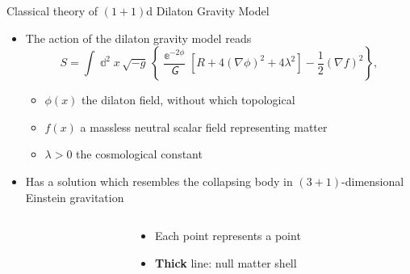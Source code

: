 \documentclass{beamer}
\newcommand{\ee}{{\Bbbe}}
\newcommand{\rbr}[1]{{\left(#1\right)}}
\newcommand{\sbr}[1]{{\left[#1\right]}}
\newcommand{\cbr}[1]{{\left\{#1\right\}}}
\newcommand{\rfun}[2]{{#1}\mathopen{}\left(#2\right)\mathclose{}}
\newcommand{\dd}{\Bbbd}
\newcommand{\ol}[1]{{\overline{{#1}}}}
\newcommand{\nG}{\mitsansG} %
\begin{document}
\begin{frame}[allowframebreaks]{Classical theory of $\rbr{1+1}$d 
Dilaton Gravity Model}{
}%

\begin{itemize}
\item The action of the dilaton gravity model reads
\begin{equation}
S = \int \dd^2 x\,\sqrt{-g}\,\cbr{\frac{\ee^{-2\phi}}{\nG}
\sbr{R+4\rbr{\nabla \phi}^2 + 4\lambda^2}
-\frac{1}{2}\rbr{\nabla f}^2},
\end{equation}
\begin{itemize}
\item $\rfun{\phi}{x}$ the dilaton field, without which topological
\item $\rfun{f}{x}$ a massless neutral scalar field representing matter
\item $\lambda > 0$ the cosmological constant
\end{itemize}

\item Has a solution which \alert{resembles} the collapsing body in 
$\rbr{3+1}$-dimensional Einstein gravitation
\end{itemize}

\begin{columns}
\begin{column}{.7\linewidth}
%

\end{column}
\begin{column}{.3\linewidth}
\begin{itemize}
 \item Each point represents a \alert{point}
 \item \textbf{Thick} line: null matter \alert{shell}
\end{itemize}
\end{column}
 
\end{columns}


\end{frame}
\end{document}
